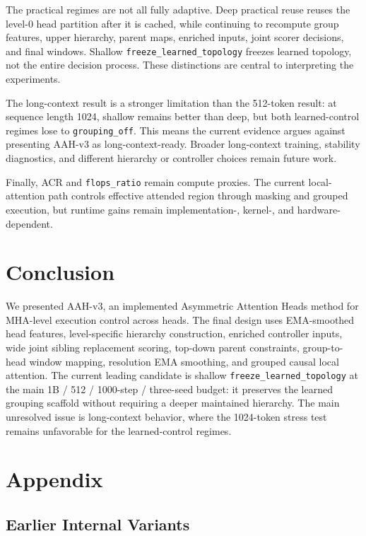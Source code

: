 \documentclass[11pt]{article}
\begin{document}
The practical regimes are not all fully adaptive. Deep practical reuse reuses the level-0 head partition after it is cached, while continuing to recompute group features, upper hierarchy, parent maps, enriched inputs, joint scorer decisions, and final windows. Shallow \texttt{freeze\_learned\_topology} freezes learned topology, not the entire decision process. These distinctions are central to interpreting the experiments.

The long-context result is a stronger limitation than the 512-token result: at sequence length 1024, shallow remains better than deep, but both learned-control regimes lose to \texttt{grouping\_off}. This means the current evidence argues against presenting AAH-v3 as long-context-ready. Broader long-context training, stability diagnostics, and different hierarchy or controller choices remain future work.

Finally, ACR and \texttt{flops\_ratio} remain compute proxies. The current local-attention path controls effective attended region through masking and grouped execution, but runtime gains remain implementation-, kernel-, and hardware-dependent.

\section{Conclusion}

We presented AAH-v3, an implemented Asymmetric Attention Heads method for MHA-level execution control across heads. The final design uses EMA-smoothed head features, level-specific hierarchy construction, enriched controller inputs, wide joint sibling replacement scoring, top-down parent constraints, group-to-head window mapping, resolution EMA smoothing, and grouped causal local attention. The current leading candidate is shallow \texttt{freeze\_learned\_topology} at the main 1B / 512 / 1000-step / three-seed budget: it preserves the learned grouping scaffold without requiring a deeper maintained hierarchy. The main unresolved issue is long-context behavior, where the 1024-token stress test remains unfavorable for the learned-control regimes.
\appendix

\section{Appendix}

\subsection{Earlier Internal Variants}
\end{document}
